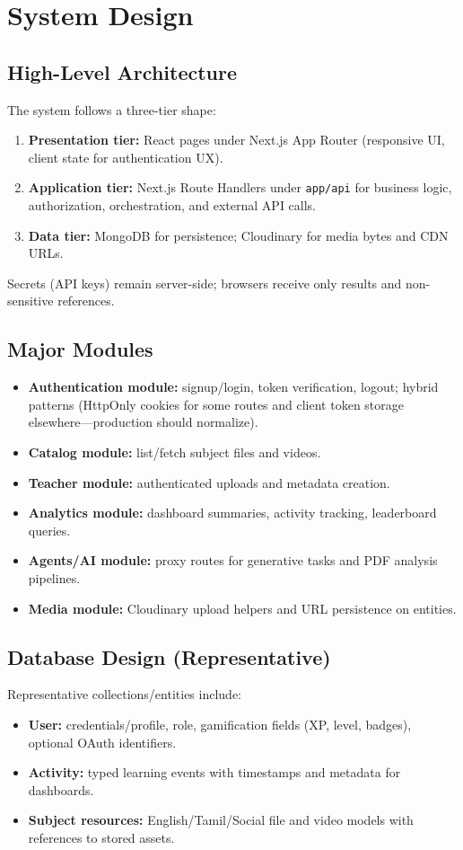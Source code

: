 \documentclass[a4paper,12pt,openany]{report}
\begin{document}
\chapter{System Design}

\section{High-Level Architecture}
The system follows a three-tier shape:
\begin{enumerate}[leftmargin=*]
\item \textbf{Presentation tier:} React pages under Next.js App Router (responsive UI, client state for authentication UX).
\item \textbf{Application tier:} Next.js Route Handlers under \texttt{app/api} for business logic, authorization, orchestration, and external API calls.
\item \textbf{Data tier:} MongoDB for persistence; Cloudinary for media bytes and CDN URLs.
\end{enumerate}
Secrets (API keys) remain server-side; browsers receive only results and non-sensitive references.

\section{Major Modules}
\begin{itemize}[leftmargin=*]
\item \textbf{Authentication module:} signup/login, token verification, logout; hybrid patterns (HttpOnly cookies for some routes and client token storage elsewhere---production should normalize).
\item \textbf{Catalog module:} list/fetch subject files and videos.
\item \textbf{Teacher module:} authenticated uploads and metadata creation.
\item \textbf{Analytics module:} dashboard summaries, activity tracking, leaderboard queries.
\item \textbf{Agents/AI module:} proxy routes for generative tasks and PDF analysis pipelines.
\item \textbf{Media module:} Cloudinary upload helpers and URL persistence on entities.
\end{itemize}

\section{Database Design (Representative)}
Representative collections/entities include:
\begin{itemize}[leftmargin=*]
\item \textbf{User:} credentials/profile, role, gamification fields (XP, level, badges), optional OAuth identifiers.
\item \textbf{Activity:} typed learning events with timestamps and metadata for dashboards.
\item \textbf{Subject resources:} English/Tamil/Social file and video models with references to stored assets.
\end{itemize}
\end{document}
